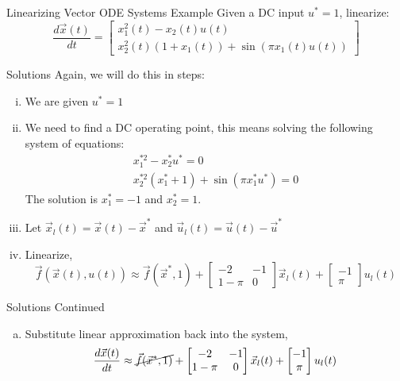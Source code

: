 \documentclass{beamer}
\begin{document}
\begin{frame}{Linearizing Vector ODE Systems Example}
Given a DC input $u^* = 1$, linearize: 
\[
\frac{d\vec{x}(t)}{dt} = \begin{bmatrix}
x_1^2(t) - x_2(t)u(t)\\
x_2^2(t)(1 + x_1(t)) + \sin(\pi x_1(t)u(t))
\end{bmatrix}
\]

\end{frame}

\begin{frame}{Solutions}
Again, we will do this in steps: 
\begin{enumerate}[(i)]
\item We are given $u^* = 1$ \pause
\item We need to find a DC operating point, this means solving the following system of equations:
\begin{align}
x_1^{*2}- x_2^*u^* = 0 \\
x_2^{*2}(x_1^* + 1) + \sin(\pi x_1^*u^*) = 0
\end{align} 
The solution is $x_1^* = -1$ and $x_2^* = 1$. \pause \\
\item Let $\vec{x}_l(t) = \vec{x}(t) - \vec{x}^*$ and $\vec{u}_l(t) = \vec{u}(t) - \vec{u}^*$ \pause \\
\item Linearize, 
\[ \vec{f}(\vec{x}(t), u(t)) \approx 
\vec{f}(\vec{x}^*, 1) + \begin{bmatrix}
-2 & -1 \\
1 - \pi & 0 
\end{bmatrix} 
\vec{x}_l(t) + \begin{bmatrix}
-1 \\ \pi
\end{bmatrix}
u_l(t)
\]



\end{enumerate}
\end{frame}

\begin{frame}{Solutions Continued}
\begin{enumerate}[(v)]
\item Substitute linear approximation back into the system,
\[ \frac{d\vec{x}(t)}{dt} \approx 
\cancel{\vec{f}(\vec{x}^*, 1)} + \begin{bmatrix}
-2 & -1 \\
1 - \pi & 0 
\end{bmatrix} 
\vec{x}_l(t) + \begin{bmatrix}
-1 \\ \pi
\end{bmatrix}
u_l(t)
\]
\end{enumerate}
\end{frame}
\end{document}
